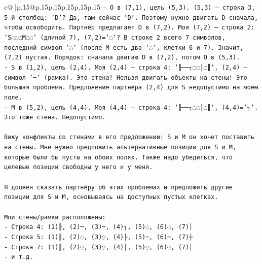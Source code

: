 \documentclass{article}
\begin{document}
{\begin{supertabular}{c@{$\;$}|p{.15\linewidth}@{}p{.15\linewidth}p{.15\linewidth}p{.15\linewidth}p{.15\linewidth}p{.15\linewidth}}
{{{\texttt{{-} O в (7,1), цель (5,3). (5,3) — строка 3, 5{-}й столбец: 'D'? Да, там сейчас 'D'. Поэтому нужно двигать D сначала, чтобы освободить. Партнёр предлагает D в (7,2). Моя (7,2) — строка 2: `S◌◌◌M◌◌` (длиной 7), (7,2)='◌'? В строке 2 всего 7 символов, последний символ '◌' (после M есть два '◌', клетки 6 и 7). Значит, (7,2) пустая. Порядок: сначала двигаю D в (7,2), потом O в (5,3).} \\
\texttt{{-} S в (1,2), цель (2,4). Моя (2,4) — строка 4: `╟──┐◌◌│◌║`, (2,4) — символ '─' (рамка). Это стена! Нельзя двигать объекты на стены! Это большая проблема. Предложение партнёра (2,4) для S недопустимо на моём поле.} \\
\texttt{{-} M в (5,2), цель (4,4). Моя (4,4) — строка 4: `╟──┐◌◌│◌║`, (4,4)='┐'. Это тоже стена. Недопустимо.} \\
\\ 
\texttt{Вижу конфликты со стенами в его предложении: S и M он хочет поставить на стены. Мне нужно предложить альтернативные позиции для S и M, которые были бы пусты на обоих полях. Также надо убедиться, что целевые позиции свободны у него и у меня.} \\
\\ 
\texttt{Я должен сказать партнёру об этих проблемах и предложить другие позиции для S и M, основываясь на доступных пустых клетках.} \\
\\ 
\texttt{Мои стены/рамки расположены:} \\
\texttt{{-} Строка 4: (1)╟, (2)─, (3)─, (4)┐, (5)◌, (6)◌, (7)│} \\
\texttt{{-} Строка 5: (1)║, (2)◌, (3)◌, (4)├, (5)─, (6)─, (7)┼} \\
\texttt{{-} Строка 7: (1)║, (2)◌, (3)◌, (4)│, (5)◌, (6)◌, (7)│} \\
\texttt{{-} и т.д.} \\
\\ 
}}}
\end{supertabular}}
\end{document}
